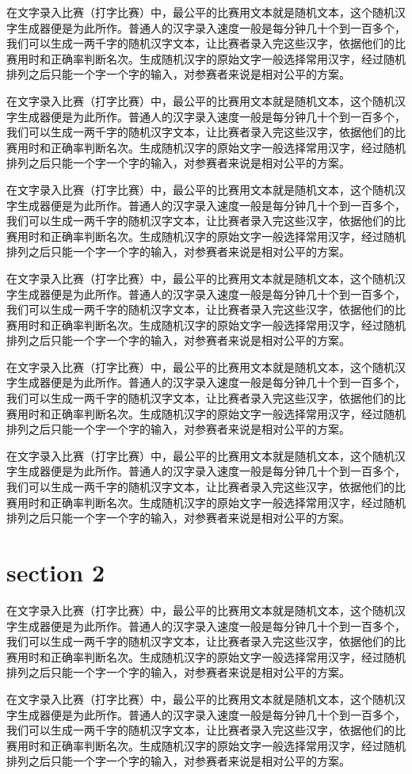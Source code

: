 \documentclass[12pt,hyperref,UTF8]{ctexbook}
\begin{document}
在文字录入比赛（打字比赛）中，最公平的比赛用文本就是随机文本，这个随机汉字生成器便是为此所作。普通人的汉字录入速度一般是每分钟几十个到一百多个，我们可以生成一两千字的随机汉字文本，让比赛者录入完这些汉字，依据他们的比赛用时和正确率判断名次。生成随机汉字的原始文字一般选择常用汉字，经过随机排列之后只能一个字一个字的输入，对参赛者来说是相对公平的方案。

在文字录入比赛（打字比赛）中，最公平的比赛用文本就是随机文本，这个随机汉字生成器便是为此所作。普通人的汉字录入速度一般是每分钟几十个到一百多个，我们可以生成一两千字的随机汉字文本，让比赛者录入完这些汉字，依据他们的比赛用时和正确率判断名次。生成随机汉字的原始文字一般选择常用汉字，经过随机排列之后只能一个字一个字的输入，对参赛者来说是相对公平的方案。

在文字录入比赛（打字比赛）中，最公平的比赛用文本就是随机文本，这个随机汉字生成器便是为此所作。普通人的汉字录入速度一般是每分钟几十个到一百多个，我们可以生成一两千字的随机汉字文本，让比赛者录入完这些汉字，依据他们的比赛用时和正确率判断名次。生成随机汉字的原始文字一般选择常用汉字，经过随机排列之后只能一个字一个字的输入，对参赛者来说是相对公平的方案。

在文字录入比赛（打字比赛）中，最公平的比赛用文本就是随机文本，这个随机汉字生成器便是为此所作。普通人的汉字录入速度一般是每分钟几十个到一百多个，我们可以生成一两千字的随机汉字文本，让比赛者录入完这些汉字，依据他们的比赛用时和正确率判断名次。生成随机汉字的原始文字一般选择常用汉字，经过随机排列之后只能一个字一个字的输入，对参赛者来说是相对公平的方案。

在文字录入比赛（打字比赛）中，最公平的比赛用文本就是随机文本，这个随机汉字生成器便是为此所作。普通人的汉字录入速度一般是每分钟几十个到一百多个，我们可以生成一两千字的随机汉字文本，让比赛者录入完这些汉字，依据他们的比赛用时和正确率判断名次。生成随机汉字的原始文字一般选择常用汉字，经过随机排列之后只能一个字一个字的输入，对参赛者来说是相对公平的方案。

在文字录入比赛（打字比赛）中，最公平的比赛用文本就是随机文本，这个随机汉字生成器便是为此所作。普通人的汉字录入速度一般是每分钟几十个到一百多个，我们可以生成一两千字的随机汉字文本，让比赛者录入完这些汉字，依据他们的比赛用时和正确率判断名次。生成随机汉字的原始文字一般选择常用汉字，经过随机排列之后只能一个字一个字的输入，对参赛者来说是相对公平的方案。

\section{section 2}

在文字录入比赛（打字比赛）中，最公平的比赛用文本就是随机文本，这个随机汉字生成器便是为此所作。普通人的汉字录入速度一般是每分钟几十个到一百多个，我们可以生成一两千字的随机汉字文本，让比赛者录入完这些汉字，依据他们的比赛用时和正确率判断名次。生成随机汉字的原始文字一般选择常用汉字，经过随机排列之后只能一个字一个字的输入，对参赛者来说是相对公平的方案。

在文字录入比赛（打字比赛）中，最公平的比赛用文本就是随机文本，这个随机汉字生成器便是为此所作。普通人的汉字录入速度一般是每分钟几十个到一百多个，我们可以生成一两千字的随机汉字文本，让比赛者录入完这些汉字，依据他们的比赛用时和正确率判断名次。生成随机汉字的原始文字一般选择常用汉字，经过随机排列之后只能一个字一个字的输入，对参赛者来说是相对公平的方案。

\backmatter
\end{document}
